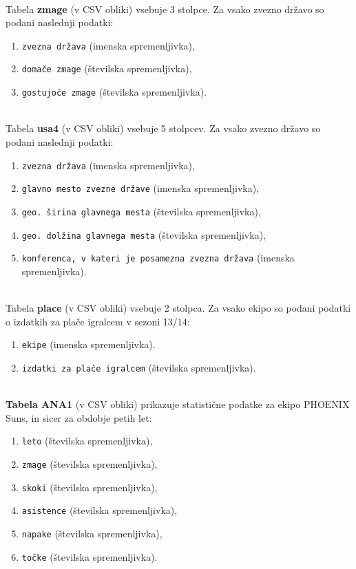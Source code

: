 \documentclass[11pt,a4paper]{article}
\begin{document}
\\

Tabela \textbf{zmage} (v CSV obliki) vsebuje 3 stolpce. Za vsako zvezno državo so podani naslednji podatki:

\begin{enumerate}
\item{\verb|zvezna država| (imenska spremenljivka),}
\item{\verb|domače zmage| (številska spremenljivka),}
\item{\verb|gostujoče zmage| (številska spremenljivka).}
\end{enumerate}

\\
Tabela \textbf{usa4} (v CSV obliki) vsebuje 5 stolpcev. Za vsako zvezno državo so podani naslednji podatki:

\begin{enumerate}
\item{\verb|zvezna država| (imenska spremenljivka),}
\item{\verb|glavno mesto zvezne države| (imenska spremenljivka),}
\item{\verb|geo. širina glavnega mesta| (številska spremenljivka),}
\item{\verb|geo. dolžina glavnega mesta| (številska spremenljivka),}
\item{\verb|konferenca, v kateri je posamezna zvezna država| (imenska spremenljivka).}
\end{enumerate}

\\
Tabela \textbf{place} (v CSV obliki) vsebuje 2 stolpca. Za vsako ekipo so podani podatki o izdatkih za plače igralcem v sezoni 13/14:

\begin{enumerate}
\item{\verb|ekipe| (imenska spremenljivka).}
\item{\verb|izdatki za plače igralcem| (številska spremenljivka).}
\end{enumerate}

\\
\textbf{Tabela ANA1} (v CSV obliki) prikazuje statistične podatke za ekipo PHOENIX Suns, in sicer za obdobje petih let:

\begin{enumerate}
\item{\verb|leto| (številska spremenljivka),}
\item{\verb|zmage| (številska spremenljivka),}
\item{\verb|skoki| (številska spremenljivka),}
\item{\verb|asistence| (številska spremenljivka),}
\item{\verb|napake| (številska spremenljivka),}
\item{\verb|točke| (številska spremenljivka).}
\end{enumerate}
\end{document}
